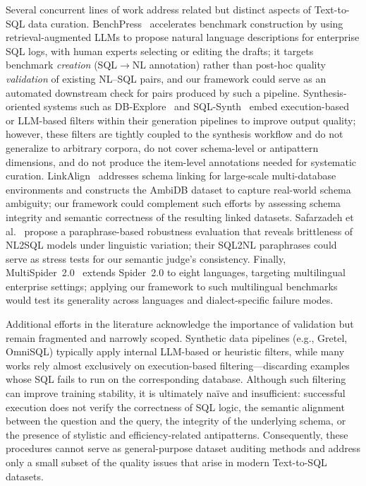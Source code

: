 \documentclass[print]{einformatica}
\begin{document}
Several concurrent lines of work address related but distinct aspects of Text-to-SQL data curation. BenchPress~\cite{wenz2025benchpress} accelerates benchmark construction by using retrieval-augmented LLMs to propose natural language descriptions for enterprise SQL logs, with human experts selecting or editing the drafts; it targets benchmark \emph{creation} (SQL$\rightarrow$NL annotation) rather than post-hoc quality \emph{validation} of existing NL--SQL pairs, and our framework could serve as an automated downstream check for pairs produced by such a pipeline. Synthesis-oriented systems such as DB-Explore~\cite{ma2025dbexplore} and SQL-Synth~\cite{wang2025sqlsynth} embed execution-based or LLM-based filters within their generation pipelines to improve output quality; however, these filters are tightly coupled to the synthesis workflow and do not generalize to arbitrary corpora, do not cover schema-level or antipattern dimensions, and do not produce the item-level annotations needed for systematic curation. LinkAlign~\cite{wang2025linkalign} addresses schema linking for large-scale multi-database environments and constructs the AmbiDB dataset to capture real-world schema ambiguity; our framework could complement such efforts by assessing schema integrity and semantic correctness of the resulting linked datasets. Safarzadeh et al.~\cite{safarzadeh2025sql2nl} propose a paraphrase-based robustness evaluation that reveals brittleness of NL2SQL models under linguistic variation; their SQL2NL paraphrases could serve as stress tests for our semantic judge's consistency. Finally, MultiSpider~2.0~\cite{pham2025multispider2} extends Spider~2.0 to eight languages, targeting multilingual enterprise settings; applying our framework to such multilingual benchmarks would test its generality across languages and dialect-specific failure modes.

Additional efforts in the literature acknowledge the importance of validation but remain fragmented and narrowly scoped. Synthetic data pipelines (e.g., Gretel, OmniSQL) typically apply internal LLM-based or heuristic filters, while many works rely almost exclusively on execution-based filtering---discarding examples whose SQL fails to run on the corresponding database. Although such filtering can improve training stability, it is ultimately naïve and insufficient: successful execution does not verify the correctness of SQL logic, the semantic alignment between the question and the query, the integrity of the underlying schema, or the presence of stylistic and efficiency-related antipatterns. Consequently, these procedures cannot serve as general-purpose dataset auditing methods and address only a small subset of the quality issues that arise in modern Text-to-SQL datasets.
\end{document}
